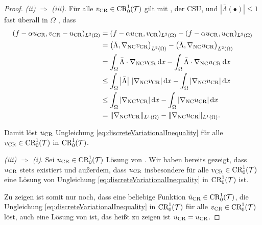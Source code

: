 \begin{proof}
  \textit{(ii) $\Rightarrow$ (iii).}
  Für alle $v_\textup{CR}\in\textup{CR}^1_0(\mathcal{T})$ gilt mit
  , der CSU,
   und
  $\left|\bar\Lambda(\bullet)\right|\leq 1$ fast überall in $\Omega$ , dass
  \begin{align*}
    (f-\alpha u_\textup{CR},v_\textup{CR}-u_\textup{CR})_{L^2(\Omega)} 
    &= 
    (f-\alpha u_\textup{CR},v_\textup{CR})_{L^2(\Omega)} 
    - (f-\alpha u_\textup{CR},u_\textup{CR})_{L^2(\Omega)} \\
    &=
    \left(\bar\Lambda,\nabla_\textup{NC}v_\textup{CR}\right)_{L^2(\Omega)}
    - \left(\bar\Lambda,\nabla_\textup{NC}u_\textup{CR}\right)_{L^2(\Omega)}\\
    &=
    \int_\Omega\bar\Lambda\cdot\nabla_\textup{NC}v_\textup{CR}\,\mathrm{d}x
    - \int_\Omega\bar\Lambda\cdot\nabla_\textup{NC}u_\textup{CR}\,\mathrm{d}x\\
    &\leq 
    \int_\Omega\left|\bar\Lambda\right|\,|\nabla_\textup{NC}v_\textup{CR}|\,\mathrm{d}x
    - \int_\Omega|\nabla_\textup{NC}u_\textup{CR}|\,\mathrm{d}x\\
    &\leq 
    \int_\Omega|\nabla_\textup{NC}v_\textup{CR}|\,\mathrm{d}x
    - \int_\Omega|\nabla_\textup{NC}u_\textup{CR}|\,\mathrm{d}x\\
    &=
    \Vert\nabla_\textup{NC}v_\textup{CR}\Vert_{L^1(\Omega)}
    -\Vert\nabla_\textup{NC}u_\textup{CR}\Vert_{L^1(\Omega)}.
  \end{align*}

  Damit löst $u_\textup{CR}$ Ungleichung \eqref{eq:discreteVariationalInequality}
  für alle $v_\textup{CR}\in\textup{CR}^1_0(\mathcal{T})$ in $\textup{CR}^1_0(\mathcal{T})$.

  \textit{(iii) $\Rightarrow$ (i)}.
  Sei $u_\textup{CR}\in\textup{CR}^1_0(\mathcal{T})$ Lösung von
  .
  Wir haben bereits gezeigt, dass $u_\textup{CR}$ stets existiert und außerdem, dass
  $u_\textup{CR}$ insbesondere für alle $v_\textup{CR}\in\textup{CR}^1_0(\mathcal{T})$ eine Lösung von
  Ungleichung \eqref{eq:discreteVariationalInequality} in $\textup{CR}^1_0(\mathcal{T})$ ist.

  Zu zeigen ist somit nur noch, dass eine beliebige Funktion
  $\tilde{u}_{\textup{CR}}\in\textup{CR}^1_0(\mathcal{T})$, die
  Ungleichung \eqref{eq:discreteVariationalInequality} in $\textup{CR}^1_0(\mathcal{T})$ für
  alle $v_\textup{CR}\in\textup{CR}^1_0(\mathcal{T})$ löst, auch eine Lösung von
   ist, das heißt zu zeigen ist
  $\tilde{u}_{\textup{CR}}=u_\textup{CR}$.


\end{proof}
